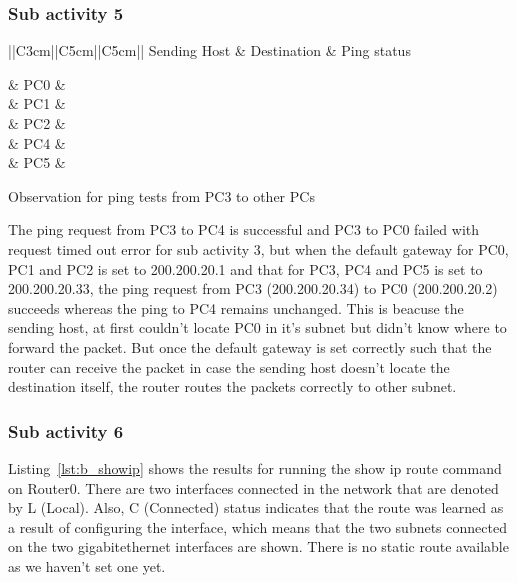 \documentclass{lab_sheet}
\newcommand{\ping}[1]{
    \begin{tabular}{||C{3cm}||C{5cm}||C{5cm}||}
        \toprule
          Sending Host & Destination & Ping status\\
          \hline
          #1
          \bottomrule
       \end{tabular}
}
\begin{document}
    \subsubsection*{Sub activity 5}
    \begin{table}[H]
      \centering
      \ping{
         & PC0 & \multirow{5}{*}{Successful} \\
        & PC1 &\\
        & PC2 & \\
        & PC4 & \\
        & PC5 & \\
      }
  \caption{Observation for ping tests from PC3 to other PCs}
  \label{tbl:activityb3}
  \end{table}
  The ping request from PC3 to PC4 is successful and PC3 to PC0 failed with request timed out error for sub activity 3, but when the default gateway for PC0, PC1 and PC2 is set to 200.200.20.1 and that for PC3, PC4 and PC5 is set to 200.200.20.33, the ping request from PC3 (200.200.20.34) to PC0 (200.200.20.2) succeeds whereas the ping to PC4 remains unchanged. This is beacuse the sending host, at first couldn't locate PC0 in it's subnet but didn't know where to forward the packet. But once the default gateway is set correctly such that the router can receive the packet in case the sending host doesn't locate the destination itself, the router routes the packets correctly to other subnet. 

    \subsubsection*{Sub activity 6}
    Listing~\ref{lst:b_showip} shows the results for running the show ip route command on Router0. There are two interfaces connected in the network that are denoted by L (Local). Also, C (Connected) status indicates that the route was learned as a result of configuring the interface, which means that the two subnets connected on the two gigabitethernet interfaces are shown. There is no static route available as we haven't set one yet.
\end{document}
